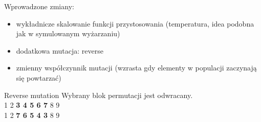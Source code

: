 \begin{frame}
Wprowadzone zmiany:

\begin{itemize}
\item wykładnicze skalowanie funkcji przystosowania (temperatura, idea podobna jak w symulowanym wyżarzaniu)
\item dodatkowa mutacja: reverse
\item zmienny współczynnik mutacji (wzrasta gdy elementy w populacji zaczynają się powtarzać)
\end{itemize}

\begin{block}{Reverse mutation}
Wybrany blok permutacji jest odwracany. \\
1 2 \textbf{3 4 5 6 7} 8 9 \\
1 2 \textbf{7 6 5 4 3} 8 9
\end{block}
\end{frame}
